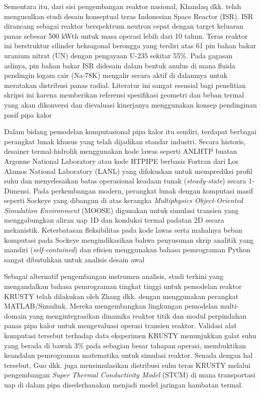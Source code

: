 \documentclass[
]{article}
\begin{document}
Sementara itu, dari sisi pengembangan reaktor nasional, Khandaq dkk.
telah mengusulkan studi desain konseptual teras Indonesian Space Reactor
(ISR). ISR dirancang sebagai reaktor berspektrum neutron cepat dengan
target keluaran panas sebesar 500 kWth untuk masa operasi lebih dari 10
tahun. Teras reaktor ini berstruktur silinder heksagonal berongga yang
terdiri atas 61 pin bahan bakar uranium nitrat (UN) dengan pengayaan
U-235 sekitar 55\%. Pada gagasan aslinya, pin bahan bakar ISR didesain
dalam bentuk anulus di mana fluida pendingin logam cair (Na-78K)
mengalir secara aktif di dalamnya untuk meratakan distribusi panas
radial. Literatur ini sangat esensial bagi penelitian skripsi ini karena
memberikan referensi spesifikasi geometri dan beban termal yang akan
dikonversi dan dievaluasi kinerjanya menggunakan konsep pendinginan
pasif pipa kalor

Dalam bidang pemodelan komputasional pipa kalor itu sendiri, terdapat
berbagai perangkat lunak khusus yang telah dijadikan standar industri.
Secara historis, desainer termal-hidrolik menggunakan kode lawas seperti
ANLHTP buatan Argonne National Laboratory atau kode HTPIPE berbasis
Fortran dari Los Alamos National Laboratory (LANL) yang difokuskan untuk
memprediksi profil suhu dan menyelesaikan batas operasional keadaan
tunak (\emph{steady-state}) secara 1-Dimensi. Pada perkembangan modern,
perangkat lunak dengan komputasi masif seperti Sockeye yang dibangun di
atas kerangka \emph{Multiphysics Object-Oriented Simulation Environment}
(MOOSE) digunakan untuk simulasi transien yang menggabungkan aliran uap
1D dan konduksi termal padatan 2D secara mekanistik. Keterbatasan
fleksibilitas pada kode lawas serta mahalnya beban komputasi pada
Sockeye mengindikasikan bahwa penyusunan skrip analitik yang mandiri
(\emph{self-contained}) dan efisien menggunakan bahasa pemrograman
Python sangat dibutuhkan untuk analisis desain awal

Sebagai alternatif pengembangan instrumen analisis, studi terkini yang
mengandalkan bahasa pemrograman tingkat tinggi untuk pemodelan reaktor
KRUSTY telah dilakukan oleh Zhang dkk. dengan menggunakan perangkat
MATLAB/Simulink. Mereka mengembangkan lingkungan pemodelan multi-domain
yang mengintegrasikan dinamika reaktor titik dan modul perpindahan panas
pipa kalor untuk mengevaluasi operasi transien reaktor. Validasi alat
komputasi tersebut terhadap data eksperimen KRUSTY menunjukkan galat
suhu yang berada di bawah 3\% pada sebagian besar tahapan operasi,
membuktikan keandalan pemrograman matematika untuk simulasi reaktor.
Senada dengan hal tersebut, Guo dkk. juga mensimulasikan distribusi suhu
teras KRUSTY melalui pengembangan \emph{Super Thermal Conductivity
Model} (STCM) di mana transportasi uap di dalam pipa disederhanakan
menjadi model jaringan hambatan termal.
\end{document}
